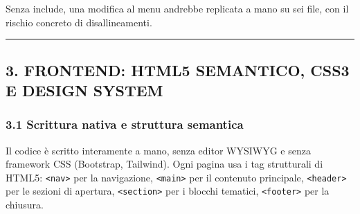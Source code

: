 \documentclass[
  11pt,
]{article}
\newenvironment{Shaded}{\begin{snugshade}}{\end{snugshade}}
\newcommand{\CommentTok}[1]{\textcolor[rgb]{0.56,0.35,0.01}{\textit{#1}}}
\newcommand{\ControlFlowTok}[1]{\textcolor[rgb]{0.13,0.29,0.53}{\textbf{#1}}}
\newcommand{\KeywordTok}[1]{\textcolor[rgb]{0.13,0.29,0.53}{\textbf{#1}}}
\newcommand{\NormalTok}[1]{#1}
\newcommand{\OperatorTok}[1]{\textcolor[rgb]{0.81,0.36,0.00}{\textbf{#1}}}
\newcommand{\OtherTok}[1]{\textcolor[rgb]{0.56,0.35,0.01}{#1}}
\newcommand{\StringTok}[1]{\textcolor[rgb]{0.31,0.60,0.02}{#1}}
\newcommand{\VariableTok}[1]{\textcolor[rgb]{0.00,0.00,0.00}{#1}}
\begin{document}
\begin{Shaded}
\end{Shaded}

Senza include, una modifica al menu andrebbe replicata a mano su sei
file, con il rischio concreto di disallineamenti.

\begin{center}\rule{0.5\linewidth}{0.5pt}\end{center}

\hypertarget{frontend-html5-semantico-css3-e-design-system}{%
\subsection{3. FRONTEND: HTML5 SEMANTICO, CSS3 E DESIGN
SYSTEM}\label{frontend-html5-semantico-css3-e-design-system}}

\hypertarget{scrittura-nativa-e-struttura-semantica}{%
\subsubsection{3.1 Scrittura nativa e struttura
semantica}\label{scrittura-nativa-e-struttura-semantica}}

Il codice è scritto interamente a mano, senza editor WYSIWYG e senza
framework CSS (Bootstrap, Tailwind). Ogni pagina usa i tag strutturali
di HTML5: \texttt{\textless{}nav\textgreater{}} per la navigazione,
\texttt{\textless{}main\textgreater{}} per il contenuto principale,
\texttt{\textless{}header\textgreater{}} per le sezioni di apertura,
\texttt{\textless{}section\textgreater{}} per i blocchi tematici,
\texttt{\textless{}footer\textgreater{}} per la chiusura.
\end{document}
